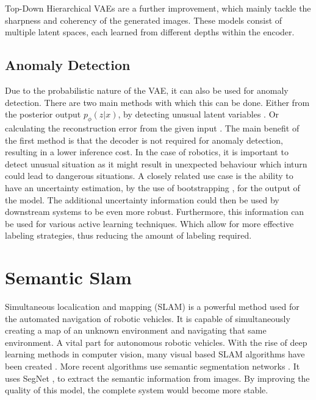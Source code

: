 Top-Down Hierarchical VAEs \cite{maaloe2019biva,NIPS2016_6ae07dcb,vahdat2020nvae} are a further improvement, which mainly tackle the sharpness and coherency of the generated images. These models consist of multiple latent spaces, each learned from different depths within the encoder.

\subsection{Anomaly Detection}
Due to the probabilistic nature of the VAE, it can also be used for anomaly detection. There are two main methods with which this can be done. Either from the posterior output $p_{\phi}(z|x)$, by detecting unusual latent variables \cite{marimont2020anomalydetectionlatentspace,angiulli2020improving,angiulli2023latent}. Or calculating the reconstruction error from the given input \cite{an2015variational, zhou2020unsupervisedanomalylocalizationusing, gouda2022unsupervised}. The main benefit of the first method is that the decoder is not required for anomaly detection, resulting in a lower inference cost. In the case of robotics, it is important to detect unusual situation as it might result in unexpected behaviour which inturn could lead to dangerous situations.
A closely related use case is the ability to have an uncertainty estimation, by the use of bootstrapping \cite{chen2018use,kohl2018probabilistic}, for the output of the model. The additional uncertainty information could then be used by downstream systems to be even more robust. Furthermore, this information can be used for various active learning \cite{hino2020active} techniques. Which allow for more effective labeling strategies, thus reducing the amount of labeling required.

\section{Semantic Slam}
Simultaneous localication and mapping (SLAM)\cite{chatila1985position} is a powerful method used for the automated navigation of robotic vehicles. It is capable of simultaneously creating a map of an unknown environment and navigating that same environment. A vital part for autonomous robotic vehicles. With the rise of deep learning methods in computer vision, many visual based SLAM algorithms have been created \cite{taketomi2017visual}. More recent algorithms use semantic segmentation networks \cite{yu2018ds}. It uses SegNet \cite{badri2017segnet}, to extract the semantic information from images. By improving the quality of this model, the complete system would become more stable.

